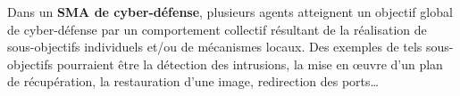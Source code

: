\documentclass[conference]{IEEEtran}
\newcommand{\old}[1]{\textcolor{orange}{#1}}
\begin{document}







Dans un \textbf{SMA de cyber-défense}, plusieurs agents atteignent un objectif global de cyber-défense par un comportement collectif résultant de la réalisation de sous-objectifs individuels et/ou de mécanismes locaux\cite{jamont2015meeting}. Des exemples de tels sous-objectifs pourraient être la détection des intrusions, la mise en œuvre d'un plan de récupération, la restauration d'une image, redirection des ports\dots
\end{document}
